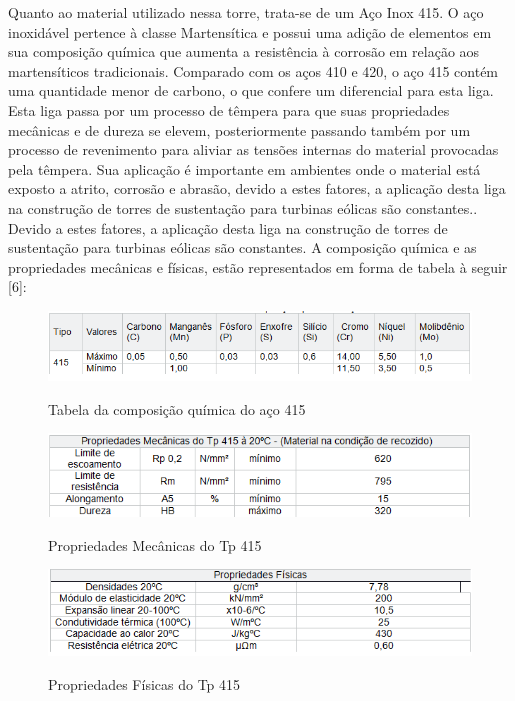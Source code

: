    Quanto ao material utilizado nessa torre, trata-se de um Aço Inox 415. O aço inoxidável pertence à classe Martensítica e possui uma adição de elementos em sua composição química que aumenta a resistência à corrosão em relação aos martensíticos tradicionais. Comparado com os aços 410 e 420, o aço 415 contém uma quantidade menor de carbono, o que confere um diferencial para esta liga. Esta liga passa por um processo de têmpera para  que suas propriedades mecânicas e de dureza se elevem, posteriormente passando também por um processo de revenimento para aliviar as tensões internas do material provocadas pela têmpera. Sua aplicação é importante em ambientes onde o material está exposto a atrito, corrosão e abrasão, devido a estes fatores, a aplicação desta liga na construção de torres de sustentação para turbinas eólicas são constantes.. Devido a estes fatores, a aplicação desta liga na construção de torres de sustentação para turbinas eólicas são constantes. A composição química e as propriedades mecânicas e físicas, estão representados em forma de tabela à seguir [6]:\footnotemark
     \begin{figure}[!h]
    \centering
    \includegraphics[scale = 1]{editaveis/figuras/composicaco_quimica_415}
    \label{composicao_415}
    \caption[Tabela da composição química do aço 415]{Tabela da composição química do aço 415}
   \end{figure}
   \FloatBarrier
   
    \begin{figure}[!h]
    \centering
    \includegraphics[scale = 1]{editaveis/figuras/propriedade_mecanica_415}
    \label{prop_mec415}
    \caption[Propriedades Mecânicas do Tp 415]{Propriedades Mecânicas do Tp 415}
   \end{figure}
   \FloatBarrier
   
   \begin{figure}[!h]
    \centering
    \includegraphics[scale = 1]{editaveis/figuras/propriedade_fisica_415}
    \label{prop_fisica415}
    \caption[Propriedades Físicas do Tp 415]{Propriedades Físicas do Tp 415}
   \end{figure}
   \FloatBarrier
   
